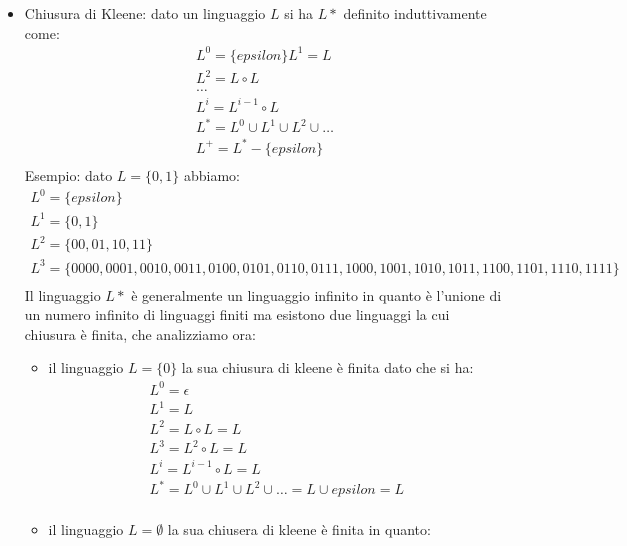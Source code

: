 \documentclass[a4paper]{report}
\theoremstyle{definition}%
\begin{document}
\begin{itemize}
  \item Chiusura di Kleene: dato un linguaggio $L$ si ha $L*$ definito induttivamente come:
    \begin{equation*}
    \begin{split}
      L^0 = \{epsilon\}
      L^1 = L \\
      L^2 = L \circ L \\
      \dots \\
      L^i = L^{i-1} \circ L\\
      L^* = L^0 \cup L^1 \cup L^2 \cup \dots \\
      L^+ = L^* - \{epsilon\} \\
    \end{split}
    \end{equation*}
    Esempio: dato $L = \{0,1\}$ abbiamo:
    \begin{equation*}
    \begin{split}
      L^0 = \{epsilon\}\\
      L^1 = \{0, 1\}\\
      L^2 = \{00, 01, 10, 11\}\\
      L^3 = \{0000, 0001, 0010, 0011, 0100, 0101, 0110, 0111, 1000, 1001, 1010, 1011, 1100, 1101, 1110, 1111\} \\
    \end{split}
    \end{equation*}
    Il linguaggio $L*$ è generalmente un linguaggio infinito in quanto è l'unione di un numero infinito di linguaggi finiti
    ma esistono due linguaggi la cui chiusura è finita, che analizziamo ora:
    \begin{itemize}
    \item il linguaggio $L = \{0\}$ la sua chiusura di kleene è finita dato che si ha:
      \begin{equation*}
      \begin{split}
        L^0 = \epsilon \\
        L^1 = L\\
        L^2 = L \circ L = L\\
        L^3 = L^2 \circ L = L\\
        L^i = L^{i-1} \circ L = L \\
        L^* = L^0 \cup L^1 \cup L^2 \cup \dots = L \cup {epsilon} = L\\
      \end{split}
      \end{equation*}
    \item il linguaggio $L = \emptyset$ la sua chiusera di kleene è finita in quanto:

\end{itemize}
\end{itemize}
\end{document}
